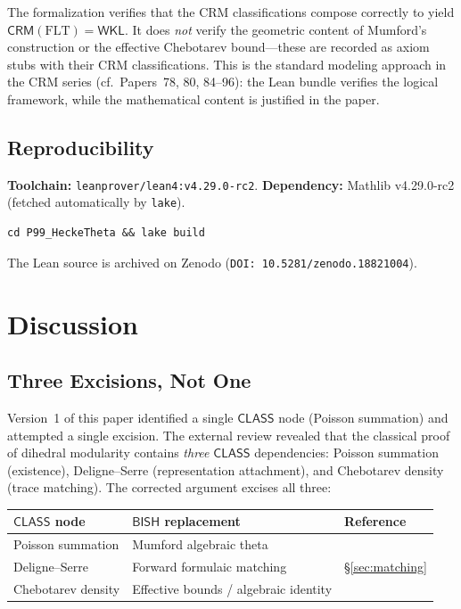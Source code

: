\documentclass[11pt,a4paper]{article}
\theoremstyle{plain}
\theoremstyle{definition}
\newcommand{\BISH}{\textsf{BISH}}
\newcommand{\WKL}{\textsf{WKL}}
\newcommand{\CLASS}{\textsf{CLASS}}
\newcommand{\CRM}{\textsf{CRM}}
\begin{document}
The formalization verifies that the CRM classifications compose correctly to yield $\CRM(\mathrm{FLT}) = \WKL$.
It does \emph{not} verify the geometric content of Mumford's construction or the effective Chebotarev bound---these are recorded as axiom stubs with their CRM classifications.
This is the standard modeling approach in the CRM series (cf.\ Papers~78, 80, 84--96): the Lean bundle verifies the logical framework, while the mathematical content is justified in the paper.

\subsection{Reproducibility}

\textbf{Toolchain:} \texttt{leanprover/lean4:v4.29.0-rc2}. \textbf{Dependency:} Mathlib v4.29.0-rc2 (fetched automatically by \texttt{lake}).

\begin{verbatim}
cd P99_HeckeTheta && lake build
\end{verbatim}

\noindent The Lean source is archived on Zenodo (\texttt{DOI: 10.5281/zenodo.18821004}).

\section{Discussion}\label{sec:discussion}

\subsection{Three Excisions, Not One}

Version~1 of this paper identified a single $\CLASS$ node (Poisson summation) and attempted a single excision.
The external review revealed that the classical proof of dihedral modularity contains \emph{three} $\CLASS$ dependencies: Poisson summation (existence), Deligne--Serre (representation attachment), and Chebotarev density (trace matching).
The corrected argument excises all three:

\begin{center}
\begin{tabular}{@{}lll@{}}
\toprule
\textbf{$\CLASS$ node} & \textbf{$\BISH$ replacement} & \textbf{Reference} \\
\midrule
Poisson summation & Mumford algebraic theta & \cite{mumford66} \\
Deligne--Serre & Forward formulaic matching & \S\ref{sec:matching} \\
Chebotarev density & Effective bounds / algebraic identity & \cite{lagarias-odlyzko77} \\
\bottomrule
\end{tabular}
\end{center}
\end{document}
